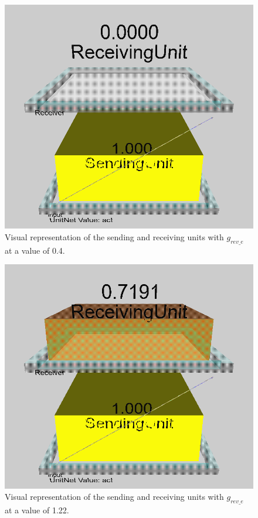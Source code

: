 \newpage
\begin{multicols}{2}
\begin{figure}[H]
\centering
\includegraphics[scale=0.225]{Media/Main/EQ1/2.5.S1.png}
\caption{Visual representation of the sending and receiving units with $g_{rev\_e}$ at a value of 0.4.}
\label{Q5.1}
\end{figure}

\begin{figure}[H]
\centering
\includegraphics[scale=0.225]{Media/Main/EQ1/2.5.S2.png}
\caption{Visual representation of the sending and receiving units with $g_{rev\_e}$ at a value of 1.22.}
\label{Q5.2}
\end{figure}


\end{multicols}

